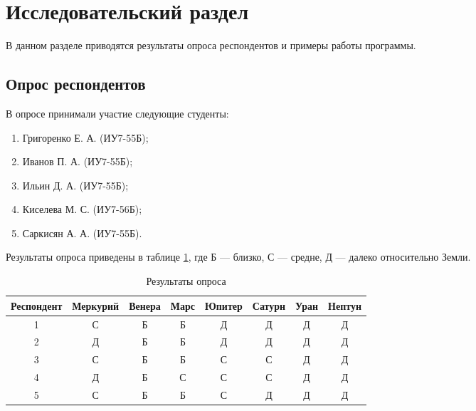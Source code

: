\section{Исследовательский раздел \hfill}
\vspace{\baselineskip}

В данном разделе приводятся результаты опроса респондентов и примеры работы программы.

\vspace{\baselineskip}
\subsection{Опрос респондентов} 
\vspace{\baselineskip}

В опросе принимали участие следующие студенты:
\begin{enumerate}
    \item Григоренко Е. А. (ИУ7-55Б);
    \item Иванов П. А. (ИУ7-55Б);
    \item Ильин Д. А. (ИУ7-55Б);
    \item Киселева М. С. (ИУ7-56Б);
    \item Саркисян А. А. (ИУ7-55Б).
\end{enumerate}

Результаты опроса приведены в таблице \ref{tabular:asking}, где Б --- близко, С --- средне, Д --- далеко относительно Земли.

\begin{table}[h!]
	\begin{center}
	    \begin{threeparttable}
	    \captionsetup{justification=raggedright, singlelinecheck=off}
	    \caption{\label{tabular:asking} Результаты опроса}
		\begin{tabular}{|c|c|c|c|c|c|c|c|}
			\hline
			Респондент & Меркурий & Венера & Марс & Юпитер & Сатурн & Уран & Нептун \tabularnewline 
                \hline
                1 & С & Б & Б & Д & Д & Д & Д \\
                \hline
                2 & Д & Б & Б & Д & Д & Д & Д \\
			\hline
                3 & С & Б & Б & С & С & Д & Д \\
                \hline
                4 & Д & Б & С & С & С & Д & Д \\
                \hline
                5 & С & Б & Б & С & Д & Д & Д \\
                \hline
		\end{tabular}
		\end{threeparttable}
	\end{center}
\end{table}

